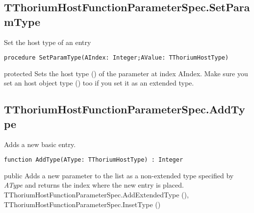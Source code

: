 \subsection{TThoriumHostFunctionParameterSpec.SetParamType}
\label{thoriumcorepkg:thorium:tthoriumhostfunctionparameterspec:setparamtype}
\begin{FPCList}
\Synopsis
Set the host type of an entry\Declaration 

\begin{verbatim}
procedure SetParamType(AIndex: Integer;AValue: TThoriumHostType)
\end{verbatim}
\Visibility
protected
\Description
Sets the host type (\pageref{thoriumcorepkg:thorium}) of the parameter at index AIndex. Make sure you set an host object type (\pageref{thoriumcorepkg:thorium:tthoriumhostobjecttype}) too if you set it as an extended type.\end{FPCList}
\subsection{TThoriumHostFunctionParameterSpec.AddType}
\label{thoriumcorepkg:thorium:tthoriumhostfunctionparameterspec:addtype}
\begin{FPCList}
\Synopsis
Adds a new basic entry.\Declaration 

\begin{verbatim}
function AddType(AType: TThoriumHostType) : Integer
\end{verbatim}
\Visibility
public
\Description
Adds a new parameter to the list as a non-extended type specified by \textit{AType} and returns the index where the new entry is placed.\SeeAlso
TThoriumHostFunctionParameterSpec.AddExtendedType (\pageref{thoriumcorepkg:thorium:tthoriumhostfunctionparameterspec:addextendedtype}),
TThoriumHostFunctionParameterSpec.InsetType (\pageref{thoriumcorepkg:thorium:tthoriumhostfunctionparameterspec})\end{FPCList}
